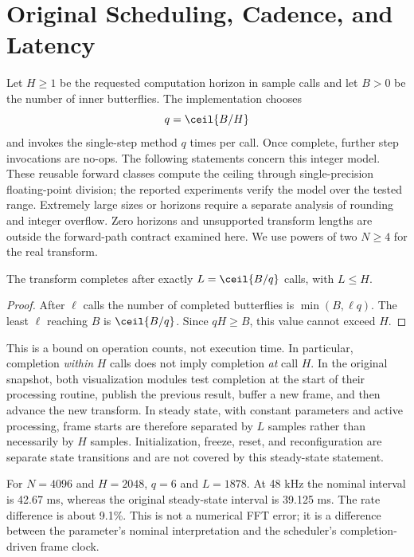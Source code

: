\section{Original Scheduling, Cadence, and Latency}
\label{sec:scheduling}
Let $H\ge1$ be the requested computation horizon in sample calls and let $B>0$
be the number of inner butterflies. The implementation chooses
\begin{equation}
 q=\ceil{B/H}
 \label{eq:quota}
\end{equation}
and invokes the single-step method $q$ times per call. Once complete, further
step invocations are no-ops. The following statements concern this integer
model. These reusable forward classes compute the ceiling through single-precision
floating-point division; the reported experiments verify the model over the
tested range. Extremely large sizes or horizons require a separate analysis of
rounding and integer overflow. Zero horizons and unsupported transform lengths
are outside the forward-path contract examined here. We use powers of two
$N\ge4$ for the real transform.

\begin{proposition}
The transform completes after exactly $L=\ceil{B/q}$ calls, with $L\le H$.
\end{proposition}
\begin{proof}
After $\ell$ calls the number of completed butterflies is
$\min(B,\ell q)$. The least $\ell$ reaching $B$ is $\ceil{B/q}$.
Since $qH\ge B$, this value cannot exceed $H$.
\end{proof}

This is a bound on operation counts, not execution time. In particular,
completion \emph{within} $H$ calls does not imply completion \emph{at} call $H$.
In the original snapshot, both visualization modules test completion at the start of their processing
routine, publish the previous result, buffer a new frame, and then advance the
new transform. In steady state, with constant parameters and active processing,
frame starts are therefore separated by $L$ samples rather than necessarily by
$H$ samples. Initialization, freeze, reset, and reconfiguration are separate
state transitions and are not covered by this steady-state statement.



For $N=4096$ and $H=2048$, $q=6$ and $L=1878$. At 48 kHz the nominal
interval is 42.67 ms, whereas the original steady-state interval is
39.125 ms. The rate difference is about 9.1\%. This is not a numerical FFT
error; it is a difference between the parameter's nominal interpretation and
the scheduler's completion-driven frame clock.

